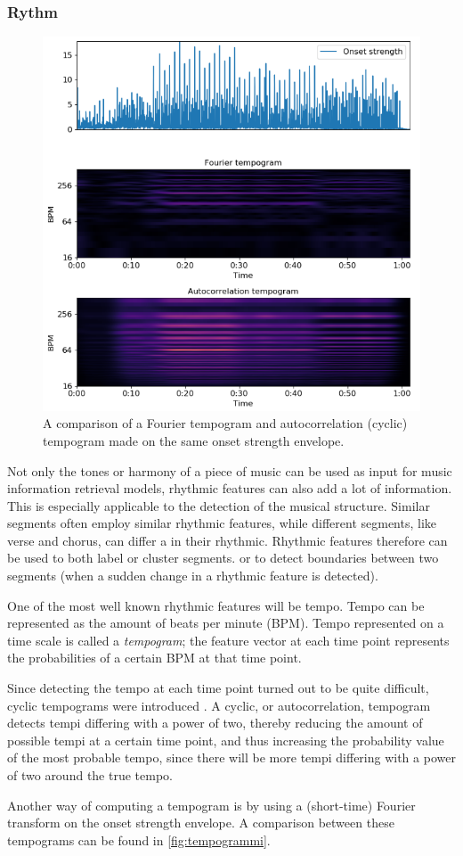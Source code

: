 \subsubsection{Rythm}
\begin{figure}[t]
    \centering
    \includegraphics[width=\textwidth]{images/tempogrammi}
    \caption{A comparison of a Fourier tempogram and autocorrelation (cyclic) tempogram made on the same onset strength envelope.}
    \label{fig:tempogrammi}
\end{figure}
Not only the tones or harmony of a piece of music can be used as input for music information retrieval models, rhythmic features can also add a lot of information. This is especially applicable to the detection of the musical structure. Similar segments often employ similar rhythmic features, while different segments, like verse and chorus, can differ a in their rhythmic. Rhythmic features therefore can be used to both label or cluster segments. or to detect boundaries between two segments (when a sudden change in a rhythmic feature is detected).

One of the most well known rhythmic features will be tempo. Tempo can be represented as the amount of beats per minute (BPM). Tempo represented on a time scale is called a \textit{tempogram}; the feature vector at each time point represents the probabilities of a certain BPM at that time point. 

Since detecting the tempo at each time point turned out to be quite difficult, cyclic tempograms were introduced \cite{Grosche2010cyclic}. A cyclic, or autocorrelation, tempogram detects tempi differing with a power of two, thereby reducing the amount of possible tempi at a certain time point, and thus increasing the probability value of the most probable tempo, since there will be more tempi differing with a power of two around the true tempo.

Another way of computing a tempogram is by using a (short-time) Fourier transform on the onset strength envelope. A comparison between these tempograms can be found in \autoref{fig:tempogrammi}.